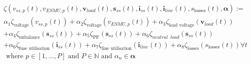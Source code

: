 \begin{multline}
	\zeta(v_{ss,p}(t), v_{ESMU,p}(t), \textbf{v}_{load}(t), \textbf{s}_{ss}(t), \textbf{i}_{ss}(t), \textbf{i}_{line}(t), s_\text{losses}(t), \boldsymbol{\alpha}) :=\\
	\alpha_1 \zeta_\text{voltage}(v_{ss,p}(t))%
	+ \alpha_2 \zeta_\text{voltage}(v_{ESMU,p}(t))%
	+ \alpha_3 \zeta_\text{load voltage}(\textbf{v}_{load}(t))\\
	+ \alpha_4 \zeta_\text{unbalance}(\textbf{s}_{ss}(t))%
	+ \alpha_5 \zeta_\text{PF}(\textbf{s}_{ss}(t))%
	+ \alpha_6 \zeta_{neutral\;\;load}(\textbf{s}_{ss}(t))\\
	+ \alpha_6 \zeta_\text{fuse utilisation}(\textbf{i}_{ss}(t))%
	+ \alpha_7 \zeta_\text{line utilisation}(\textbf{i}_{line}(t))%
	+ \alpha_8 \zeta_\text{losses}(s_\text{losses}(t))%
	 \forall t \\
	 \text{ where } p \in [1, \dots, P] \text{ and } P \in \mathbb{N} \text{ and } \alpha_n \in \boldsymbol{\alpha}
\label{ch1:equ:weighted-sum-cost-function}
\end{multline}